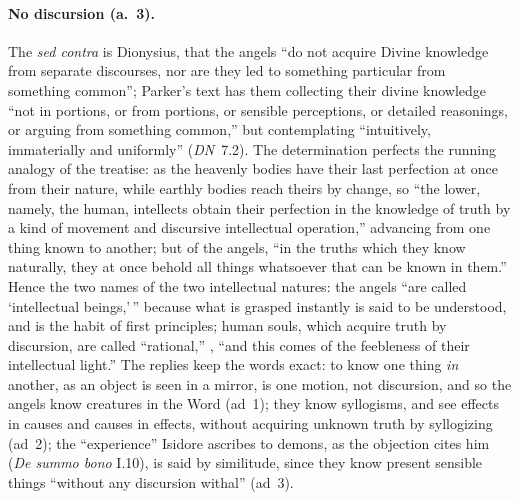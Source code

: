 \paragraph{No discursion (a.~3).} The \emph{sed contra} is Dionysius, that
the angels ``do not acquire Divine knowledge from separate discourses,
nor are they led to something particular from something common''; Parker's
text has them collecting their divine knowledge ``not in portions, or from
portions, or sensible perceptions, or detailed reasonings, or arguing from
something common,'' but contemplating ``intuitively, immaterially and
uniformly'' (\emph{DN}~7.2). The determination perfects the running
analogy of the treatise: as the heavenly bodies have their last perfection
at once from their nature, while earthly bodies reach theirs by change, so
``the lower, namely, the human, intellects obtain their perfection in the
knowledge of truth by a kind of movement and discursive intellectual
operation,'' advancing from one thing known to another; but of the
angels, ``in the truths which they know naturally, they at once behold
all things whatsoever that can be known in them.'' Hence the two names of the two
intellectual natures: the angels ``are called `intellectual beings,'\,''
because what is grasped instantly is said to be understood, and
 is the habit of first principles; human souls, which
acquire truth by discursion, are called ``rational,'' ,
``and this comes of the feebleness of their intellectual light.'' The
replies keep the words exact: to know one thing \emph{in} another, as an
object is seen in a mirror, is one motion, not discursion, and so the
angels know creatures in the Word (ad~1); they know syllogisms, and see
effects in causes and causes in effects, without acquiring unknown truth
by syllogizing (ad~2); the ``experience'' Isidore ascribes to demons, as
the objection cites him (\emph{De summo bono} I.10), is said by
similitude, since they know present sensible things ``without any
discursion withal'' (ad~3).

